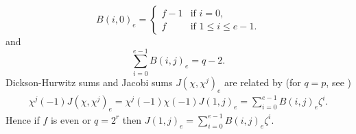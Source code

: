 \documentclass[a4paper,12pt]{article}
\begin{document}
\begin{equation}\label{eq:5}
B(i,0)_{e} =
\begin{cases}
f-1 & \text{if $i = 0$,}\\
f & \text{if $1\leq i \leq{e-1}$.}
\end{cases}
\end{equation}
and \begin{equation}\label{eq:6}
\sum_{i=0}^{e-1}B(i,j)_{e} = q-2.\end{equation}
\noindent Dickson-Hurwitz sums and Jacobi sums $J(\chi,\chi^{j})_{e}$ are related by (for $q = p$, see \cite{2})
\begin{eqnarray}\label{eq:7}
\chi^{j}(-1)J(\chi,\chi^{j})_{e} = \chi^{j}(-1)\chi(-1)J(1,j)_{e} = \sum_{i=0}^{e-1}B(i,j)_{e}\zeta^i.
\end{eqnarray}
Hence if $f$ is even or $q =2^r$ then $J(1,j)_{e} = \displaystyle{\sum_{i=0}^{e-1}B(i,j)_{e}\zeta^i.}$
\end{document}
